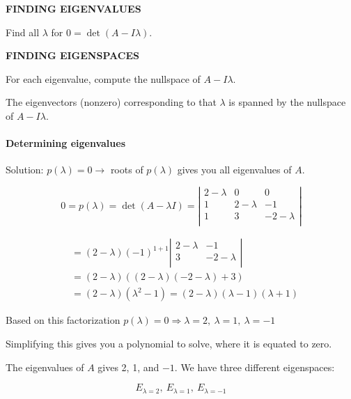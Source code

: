 \documentclass[12pt]{article}
\theoremstyle{plain}
\theoremstyle{remark}
\theoremstyle{definition}
\begin{document}
\begin{framed}

\textbf{FINDING EIGENVALUES}

Find all \(\lambda\) for \(0 = \det(A - I\lambda)\).

\textbf{FINDING EIGENSPACES}

For each eigenvalue, compute the nullspace of \(A - I\lambda\).

The eigenvectors (nonzero) corresponding to that \(\lambda\) is spanned
by the nullspace of \(A - I\lambda\).

\end{framed}




\paragraph{Determining eigenvalues}

Solution: \(p(\lambda) = 0 \rightarrow\) roots of \(p(\lambda)\) gives
you all eigenvalues of \(A\).

\[0 = p(\lambda) = \det(A - \lambda I) = \left| \begin{matrix}
2 - \lambda & 0 & 0 \\
1 & 2 - \lambda & - 1 \\
1 & 3 & - 2 - \lambda \\
\end{matrix} \right|\]

\begin{align*}
&= (2 - \lambda)( - 1)^{1 + 1}\left| \begin{matrix}2 - \lambda & - 1 \\3 & - 2 - \lambda \\\end{matrix} \right| \\
&= (2 - \lambda)\left( (2 - \lambda)( - 2 - \lambda) + 3 \right) \\
&= (2 - \lambda)\left( \lambda^{2} - 1 \right) = (2 - \lambda)(\lambda - 1)(\lambda + 1)
\end{align*}


Based on this factorization
\(p(\lambda) = 0 \Rightarrow \lambda = 2,\ \lambda = 1,\ \lambda = - 1\)

Simplifying this gives you a polynomial to solve, where it is equated to
zero.

The eigenvalues of \(A\) gives 2, 1, and \(- 1\). We have three
different eigenspaces:

\[E_{\lambda = 2},\ E_{\lambda = 1},\ E_{\lambda = - 1}\]
\end{document}

